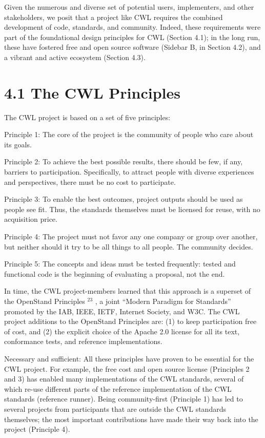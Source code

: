 \documentclass[
]{article}
\begin{document}
Given the numerous and diverse set of potential users, implementers, and
other stakeholders, we posit that a project like CWL requires the
combined development of code, standards, and community. Indeed, these
requirements were part of the foundational design principles for CWL
(Section 4.1); in the long run, these have fostered free and open source
software (Sidebar B, in Section 4.2), and a vibrant and active ecosystem
(Section 4.3).

\section{4.1 The CWL Principles}\label{the-cwl-principles}

The CWL project is based on a set of five principles:

Principle 1: The core of the project is the community of people who care
about its goals.

Principle 2: To achieve the best possible results, there should be few,
if any, barriers to participation. Specifically, to attract people with
diverse experiences and perspectives, there must be no cost to
participate.

Principle 3: To enable the best outcomes, project outputs should be used
as people see fit. Thus, the standards themselves must be licensed for
reuse, with no acquisition price.

Principle 4: The project must not favor any one company or group over
another, but neither should it try to be all things to all people. The
community decides.

Principle 5: The concepts and ideas must be tested frequently: tested
and functional code is the beginning of evaluating a proposal, not the
end.

In time, the CWL project-members learned that this approach is a
superset of the OpenStand Principles \(^{23}\) , a joint ``Modern
Paradigm for Standards'' promoted by the IAB, IEEE, IETF, Internet
Society, and W3C. The CWL project additions to the OpenStand Principles
are: (1) to keep participation free of cost, and (2) the explicit choice
of the Apache 2.0 license for all its text, conformance tests, and
reference implementations.

Necessary and sufficient: All these principles have proven to be
essential for the CWL project. For example, the free cost and open
source license (Principles 2 and 3) has enabled many implementations of
the CWL standards, several of which re-use different parts of the
reference implementation of the CWL standards (reference runner). Being
community-first (Principle 1) has led to several projects from
participants that are outside the CWL standards themselves; the most
important contributions have made their way back into the project
(Principle 4).
\end{document}
